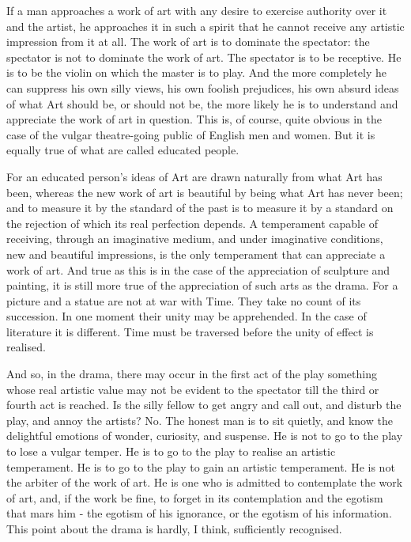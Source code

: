 If a man approaches a work of art with any desire to exercise authority over it and the artist, he approaches it in such a spirit that he cannot receive any artistic impression from it at all. The work of art is to dominate the spectator: the spectator is not to dominate the work of art. The spectator is to be receptive. He is to be the violin on which the master is to play. And the more completely he can suppress his own silly views, his own foolish prejudices, his own absurd ideas of what Art should be, or should not be, the more likely he is to understand and appreciate the work of art in question. This is, of course, quite obvious in the case of the vulgar theatre-going public of English men and women. But it is equally true of what are called educated people.\par

For an educated person’s ideas of Art are drawn naturally from what Art has been, whereas the new work of art is beautiful by being what Art has never been; and to measure it by the standard of the past is to measure it by a standard on the rejection of which its real perfection depends. A temperament capable of receiving, through an imaginative medium, and under imaginative conditions, new and beautiful impressions, is the only temperament that can appreciate a work of art. And true as this is in the case of the appreciation of sculpture and painting, it is still more true of the appreciation of such arts as the drama. For a picture and a statue are not at war with Time. They take no count of its succession. In one moment their unity may be apprehended. In the case of literature it is different. Time must be traversed before the unity of effect is realised.\par

And so, in the drama, there may occur in the first act of the play something whose real artistic value may not be evident to the spectator till the third or fourth act is reached. Is the silly fellow to get angry and call out, and disturb the play, and annoy the artists? No. The honest man is to sit quietly, and know the delightful emotions of wonder, curiosity, and suspense. He is not to go to the play to lose a vulgar temper. He is to go to the play to realise an artistic temperament. He is to go to the play to gain an artistic temperament. He is not the arbiter of the work of art. He is one who is admitted to contemplate the work of art, and, if the work be fine, to forget in its contemplation and the egotism that mars him - the egotism of his ignorance, or the egotism of his information. This point about the drama is hardly, I think, sufficiently recognised.\par

